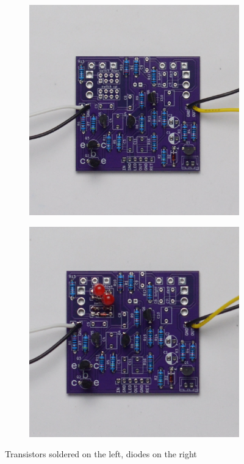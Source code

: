 \documentclass[a4paper,12pt]{article}
\begin{document}
\begin{figure}[h!]
  \centering
  \begin{subfigure}[b]{0.49\textwidth}
    \centering
    \includegraphics[width=\textwidth]{build/12-board-transistors-1000px.jpg}
  \end{subfigure}
  \begin{subfigure}[b]{0.49\textwidth}
    \centering
    \includegraphics[width=\textwidth]{build/13-board-clipping-1000px.jpg}
  \end{subfigure}
  \caption{Transistors soldered on the left, diodes on the right}
\end{figure}
\end{document}
